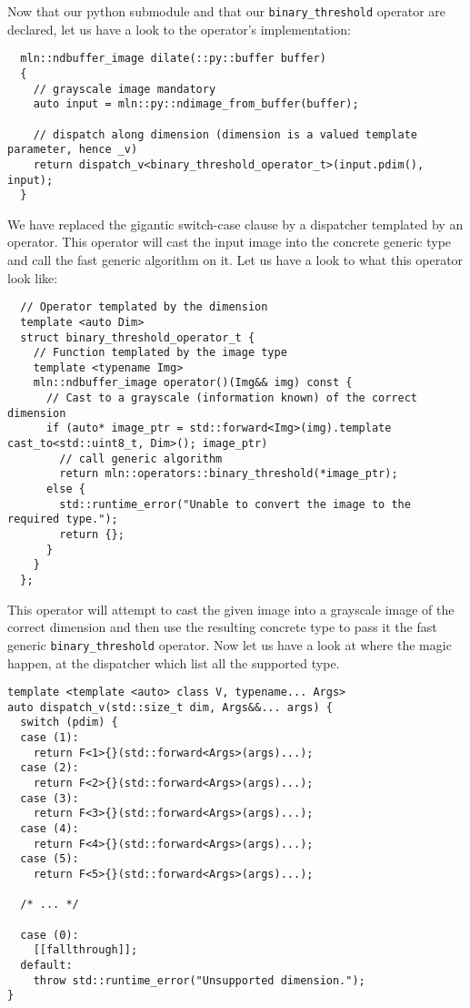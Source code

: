 Now that our python submodule and that our \texttt{binary\_threshold} operator are declared, let us have a look to the
operator's implementation:

\begin{verbatim}
  mln::ndbuffer_image dilate(::py::buffer buffer)
  {
    // grayscale image mandatory
    auto input = mln::py::ndimage_from_buffer(buffer);

    // dispatch along dimension (dimension is a valued template parameter, hence _v)
    return dispatch_v<binary_threshold_operator_t>(input.pdim(), input);
  }
\end{verbatim}

We have replaced the gigantic switch-case clause by a dispatcher templated by an operator. This operator will cast the
input image into the concrete generic type and call the fast generic algorithm on it. Let us have a look to what this
operator look like:

\begin{verbatim}
  // Operator templated by the dimension
  template <auto Dim>
  struct binary_threshold_operator_t {
    // Function templated by the image type
    template <typename Img>
    mln::ndbuffer_image operator()(Img&& img) const {
      // Cast to a grayscale (information known) of the correct dimension
      if (auto* image_ptr = std::forward<Img>(img).template cast_to<std::uint8_t, Dim>(); image_ptr)
        // call generic algorithm
        return mln::operators::binary_threshold(*image_ptr);
      else {
        std::runtime_error("Unable to convert the image to the required type.");
        return {};
      }
    }
  };
\end{verbatim}

This operator will attempt to cast the given image into a grayscale image of the correct dimension and then use the
resulting concrete type to pass it the fast generic \texttt{binary\_threshold} operator. Now let us have a look at where
the magic happen, at the dispatcher which list all the supported type.

\begin{verbatim}
template <template <auto> class V, typename... Args>
auto dispatch_v(std::size_t dim, Args&&... args) {
  switch (pdim) {
  case (1):
    return F<1>{}(std::forward<Args>(args)...);
  case (2):
    return F<2>{}(std::forward<Args>(args)...);
  case (3):
    return F<3>{}(std::forward<Args>(args)...);
  case (4):
    return F<4>{}(std::forward<Args>(args)...);
  case (5):
    return F<5>{}(std::forward<Args>(args)...);

  /* ... */

  case (0):
    [[fallthrough]];
  default:
    throw std::runtime_error("Unsupported dimension.");
}
\end{verbatim}

